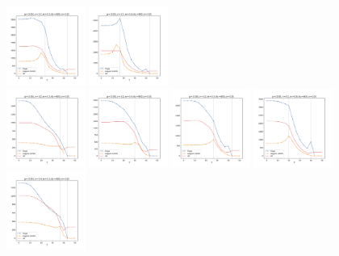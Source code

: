 \documentclass[a4paper]{article}
\begin{document}
\begin{figure}[H]
  \includegraphics[width=0.23\textwidth]{grid-g3-v4-w3_0}
  \includegraphics[width=0.23\textwidth]{grid-g3-v4-w4_0}
  \\
  \includegraphics[width=0.23\textwidth]{grid-g3-v5-w1_0}
  \includegraphics[width=0.23\textwidth]{grid-g3-v5-w2_0}
  \includegraphics[width=0.23\textwidth]{grid-g3-v5-w3_0}
  \includegraphics[width=0.23\textwidth]{grid-g3-v5-w4_0}
  \\
  \includegraphics[width=0.23\textwidth]{grid-g3-v6-w1_0}

\end{figure}
\end{document}
